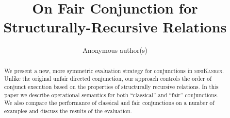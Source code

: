\documentclass[runningheads]{llncs}
\newcommand{\mk}{\textsc{miniKanren}\xspace}
\begin{document}
\title{On Fair Conjunction for Structurally-Recursive Relations}

\author{Anonymous author(s)}

\maketitle

\begin{abstract}
We present a new, more symmetric evaluation strategy for conjunctions in \mk. Unlike the original unfair directed conjunction, our approach controls the order of conjunct execution based on the properties of structurally recursive relations. In this paper we describe operational semantics for both ``classical'' and ``fair'' conjunctions. We also compare the performance of classical and fair conjunctions on a number of examples and discuss the results of the evaluation.
\end{abstract}



\thispagestyle{empty}











\end{document}
